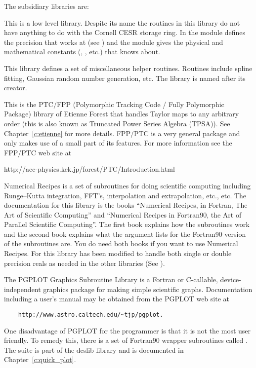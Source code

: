 The subsidiary libraries are: 
\begin{description}
\item[cesr\_utils] 
This is a low level library. Despite its name the
routines in this library do not have anything to do with the Cornell
CESR storage ring.  In  the module 
defines the precision that \bmad works at (see
) and the module 
gives the physical and mathematical constants (, ,
etc.) that \bmad knows about.

\item[dcslib] 
This library defines a set of miscellaneous helper
routines.  Routines include spline fitting, Gaussian random number
generation, etc. The library is named after its creator.

\item[forest] 
This is the PTC/FPP (Polymorphic Tracking Code /
Fully Polymorphic Package) library of Etienne Forest that handles
Taylor maps to any arbitrary order (this is also known as Truncated
Power Series Algebra (TPSA)). See Chapter~\ref{c:etienne} for more
details.  FPP/PTC is a very general package and \bmad only makes use
of a small part of its features.  For more information see the FPP/PTC
web site at
\begin{example} 
   http://acc-physics.kek.jp/forest/PTC/Introduction.html
\end{example}

\item[recipes] 
Numerical Recipes is a set of subroutines for doing
scientific computing including Runge--Kutta integration, FFT's,
interpolation and extrapolation, etc., etc. The documentation for this
library is the books ``Numerical Recipes, in Fortran, The Art of
Scientific Computing'' and ``Numerical Recipes in
Fortran90, the Art of Parallel Scientific Computing''\cite{b:nr}.
The first book explains how the subroutines work and the second book
explains what the argument lists for the Fortran90 version of the
subroutines are. You do need both books if you want to use Numerical
Recipes.  For \bmad this library has been modified to handle both
single or double precision reals as needed in the other libraries (See
).

\item[PGPLOT] 
The PGPLOT Graphics Subroutine Library is a Fortran or
C-callable, device-independent graphics package for making simple
scientific graphs. Documentation including a user's manual may be
obtained from the PGPLOT web site at
\begin{verbatim}
    http://www.astro.caltech.edu/~tjp/pgplot.
\end{verbatim} 
One disadvantage of PGPLOT for the programmer is that it is not the
most user friendly. To remedy this, there is a set of Fortran90
wrapper subroutines called .  The 
suite is part of the dcslib library and is documented in
Chapter~\ref{c:quick_plot}.


\end{description}
